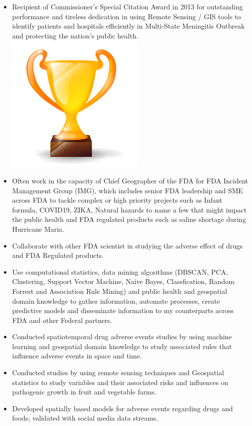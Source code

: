 \documentclass[letterpaper]{twentysecondcv} %
\begin{document}
\begin{twenty}
{{\begin{itemize}
        \item	Recipient of Commissioner’s Special Citation Award in 2013 for outstanding performance and tireless dedication in using Remote Sensing / GIS tools to identify patients and hospitals efficiently in Multi-State Meningitis Outbreak and protecting the nation’s public health.   \includegraphics[scale=0.05]{img/trophy.png}

\vspace{1mm}

        \item	Often work in the capacity of Chief Geographer of the FDA for FDA Incident Management Group (IMG), which includes senior FDA leadership and SME across FDA to tackle complex or high priority projects such as Infant formula, COVID19, ZIKA, Natural hazards to name a few that might impact the public health and FDA regulated products such as saline shortage during Hurricane Maria.
        
  \vspace{1mm}
              \item	Collaborate with other FDA scientist in studying the adverse effect of drugs and FDA Regulated products.

\item	Use computational statistics, data mining algorithms (DBSCAN, PCA, Clustering, Support Vector Machine, Naïve Bayes, Classfication, Random Forrest and Association Rule Mining) and public health and geospatial domain knowledge to gather information, automate processes, create predictive models and disseminate information to my counterparts across FDA and other Federal partners.   
          \vspace{1mm}
        \item Conducted spatiotemporal drug adverse events studies by using machine learning and geospatial domain knowledge to study associated rules that influence adverse events in space and time. 
          \vspace{1mm}
        \item Conducted studies by using remote sensing techniques and Geospatial statistics to study variables and their associated risks and influences on pathogenic growth in fruit and vegetable farms.
          \vspace{1mm}
        \item	Developed spatially based models for adverse events regarding drugs and foods; validated with social media data streams. 
        \vspace{1mm}


\end{itemize}}}
\end{twenty}
\end{document}
